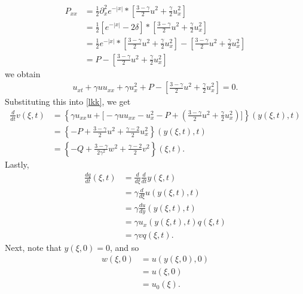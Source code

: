 \documentclass[12pt,reqno]{amsart}
\numberwithin{equation}{section}  %
\numberwithin{figure}{section}
\newcommand{\p}{\partial}
\begin{document}
\begin{equation*}
\begin{split}
P_{xx}
&  = \frac{1}{2} \p_{x}^{2}e^{-| x |}* \left [ \frac{3 - \gamma}{2}u^{2} + \frac{\gamma}{2} u_{x}^{2} \right ] 
\\
& = \frac{1}{2} \left [ e^{-| x |} - 2 \delta \right ] * \left [ \frac{3 - \gamma}{2}u^{2} + \frac{\gamma}{2} u_{x}^{2} \right ] 
\\
& = \frac{1}{2} e^{-| x |} * \left [ \frac{3 - \gamma}{2}u^{2} +
\frac{\gamma}{2} u_{x}^{2} \right ] - \left [ \frac{3 -
\gamma}{2}u^{2} + \frac{\gamma}{2} u_{x}^{2} \right ] 
\\
& = P - \left [ \frac{3 -
\gamma}{2}u^{2} + \frac{\gamma}{2} u_{x}^{2} \right ] 
\end{split}
\end{equation*}
%
%
we obtain
%
%
\begin{equation*}
\begin{split}
u_{xt} + \gamma u u_{xx} + \gamma u_{x}^{2} + P - \left [ \frac{3 -
\gamma}{2}u^{2} + \frac{\gamma}{2} u_{x}^{2} \right ]  = 0.
\end{split}
\end{equation*}
%
%
Substituting this into \eqref{lkk}, we get
%
%
\begin{equation*}
\begin{split}
\frac{d}{dt}v(\xi, t)
& = \left \{ \gamma u_{xx} u + \big[- \gamma uu_{xx} - u_{x}^{2} - P + \left ( \frac{3 - \gamma}{2} u^{2} + \frac{\gamma}{2}u_{x}^{2} \right ) ] \right \}(y(\xi, t), t)
\\
& = \left \{- P  + \frac{3 - \gamma}{2} u^{2} + \frac{\gamma-2}{2} u_{x}^{2} \right \}(y(\xi, t), t)
\\
& = \left \{-Q + \frac{3- \gamma}{2 \gamma^{2}}w^{2} + \frac{\gamma-2}{2}
v^{2} \right \}(\xi, t).
\end{split}
\end{equation*}
%
Lastly,
%
%
%
%
\begin{equation*}
\begin{split}
\frac{dq}{dt}(\xi, t)
& = \frac{d}{d\xi}\frac{d}{dt}y(\xi, t)
\\
& = \gamma \frac{d}{d \xi}u(y(\xi, t), t)
\\
& = \gamma \frac{du}{dy}(y(\xi,t),t)
\\
& = \gamma u_{x}(y(\xi, t), t)q(\xi, t)
\\
& = \gamma vq(\xi, t).
\end{split}
\end{equation*}
%
%
Next, note that $y(\xi, 0) = 0$, and so
%
%
\begin{equation*}
\begin{split}
w(\xi, 0)
& =  u(y(\xi, 0), 0)
\\
& =  u(\xi, 0)
\\
& =  u_{0}(\xi).
\end{split}
\end{equation*}
%
%
\end{document}
